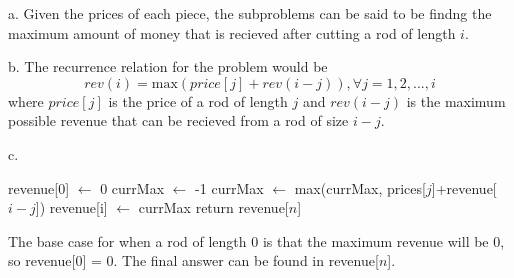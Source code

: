 \documentclass[12pt]{article}
\begin{document}
a. Given the prices of each piece, the subproblems can be said to be findng the maximum amount of money that is recieved after cutting a rod of length $i$.

b. The recurrence relation for the problem would be 
$$
rev(i) = \text{max}(price[j] + rev(i-j)), \forall j = 1,2, ..., i
$$
where $price[j]$ is the price of a rod of length $j$ and $rev(i-j)$ is the maximum possible revenue that can be recieved from a rod of size $i-j$.

c. 
\begin{algorithmic}
        \State revenue[0] $\gets$ 0
            \State currMax $\gets$ -1
                \State currMax $\gets$ max(currMax, prices[$j$]+revenue[$i-j$])
            \EndFor
            \State revenue[i] $\gets$ currMax
        \EndFor
        \State return revenue[$n$]
    \EndProcedure
\end{algorithmic}
The base case for when a rod of length 0 is that the maximum revenue will be 0, so revenue[0] = 0. The final answer can be found in revenue[$n$]. 
\end{document}
